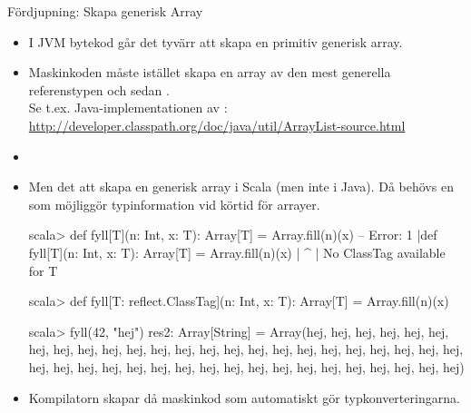 \begin{Slide}{Fördjupning: Skapa generisk Array}\SlideFontTiny
\begin{itemize}
\item I JVM bytekod går det tyvärr  att skapa en primitiv generisk array.

\item Maskinkoden måste istället skapa en array av den mest generella referenstypen  
och sedan .\\ Se t.ex. Java-implementationen av :\\\href{http://developer.classpath.org/doc/java/util/ArrayList-source.html}{http://developer.classpath.org/doc/java/util/ArrayList-source.html} %
\item[]
\item Men det  att skapa en generisk array i Scala (men inte i Java). Då behövs en  som möjliggör typinformation vid körtid för arrayer. \\
\begin{REPLsmall}
scala> def fyll[T](n: Int, x: T): Array[T] = Array.fill(n)(x)
-- Error:
1 |def fyll[T](n: Int, x: T): Array[T] = Array.fill(n)(x)
  |                                                      ^
  |  No ClassTag available for T

scala> def fyll[T: reflect.ClassTag](n: Int, x: T): Array[T] = Array.fill(n)(x)

scala> fyll(42, "hej")
res2: Array[String] = Array(hej, hej, hej, hej, hej, hej, hej, hej, hej, hej, hej, hej, hej, hej, hej, hej, hej, hej, hej, hej, hej, hej, hej, hej, hej, hej, hej, hej, hej, hej, hej, hej, hej, hej, hej, hej, hej, hej, hej, hej, hej, hej)

\end{REPLsmall}
\item Kompilatorn skapar då maskinkod som automatiskt gör typkonverteringarna.

\end{itemize}
\end{Slide}
